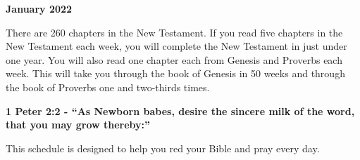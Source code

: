\documentclass[11pt,landscape,twocolumn,letterpaper]{article}
\begin{document}

\begin{center}
\textbf{January 2022}
\end{center}
There are 260 chapters in the New Testament.  If you read five chapters in the New Testament each week, you will complete the New Testament in just under one year.  You will also read one chapter each from Genesis and Proverbs each week.  This will take you through the book of Genesis in 50 weeks and through the book of Proverbs one and two-thirds times.

\begin{center}
\textcolor[rgb]{0.00,0.00,1.00}{\textbf{1 Peter 2:2 - ``As Newborn babes, desire the sincere milk of the word, that you may grow thereby:''}}
\end{center}

This schedule is designed to help you red your Bible and pray every day.\\
\end{document}
